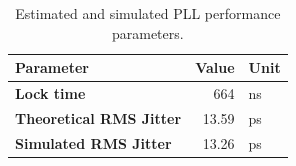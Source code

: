
		\begin{table}[h!]
			\centering
			\def\arraystretch{1.5}		
			\setlength\arrayrulewidth{0.75pt}
			\setlength{\tabcolsep}{1em} %
			\begin{tabular}{|l|r|l|}
				\hline 
				\rule[-1ex]{0pt}{2.5ex} \cellcolor{gray!40}\textbf{Parameter} & \cellcolor{gray!40}\textbf{Value} & \cellcolor{gray!40}\textbf{Unit }\\ 
				\hline 
				\rule[-1ex]{0pt}{2.5ex} \textbf{Lock time}  & 664 & ns \\
				\hline 
				\rule[-1ex]{0pt}{2.5ex} \textbf{Theoretical RMS Jitter} & 13.59 & ps\\ 
				\hline 
				\rule[-1ex]{0pt}{2.5ex} \textbf{Simulated RMS Jitter} & 13.26 & ps\\ 
				\hline 
			\end{tabular} 

			\caption{Estimated and simulated PLL performance parameters.}
			\label{behav_simulation_results}
		\end{table}





